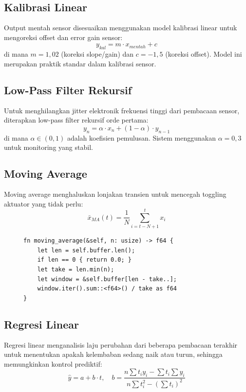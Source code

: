 \documentclass[journal]{IEEEtran}
\begin{document}
\subsection{Kalibrasi Linear}
Output mentah sensor disesuaikan menggunakan model kalibrasi linear untuk mengoreksi offset dan error gain sensor:
\begin{equation}
  y_{kal} = m \cdot x_{mentah} + c
\end{equation}
di mana $m = 1,02$ (koreksi slope/gain) dan $c = -1,5$ (koreksi offset). Model ini merupakan praktik standar dalam kalibrasi sensor.

\subsection{Low-Pass Filter Rekursif}
Untuk menghilangkan jitter elektronik frekuensi tinggi dari pembacaan sensor, diterapkan low-pass filter rekursif orde pertama:
\begin{equation}
  y_n = \alpha \cdot x_n + (1 - \alpha) \cdot y_{n-1}
\end{equation}
di mana $\alpha \in (0,1)$ adalah koefisien pemulusan. Sistem menggunakan $\alpha = 0,3$ untuk monitoring yang stabil.

\subsection{Moving Average}
Moving average menghaluskan lonjakan transien untuk mencegah toggling aktuator yang tidak perlu:
\begin{equation}
  \bar{x}_{MA}(t) = \frac{1}{N} \sum_{i=t-N+1}^{t} x_i
\end{equation}

\begin{figure}[H]
\begin{lstlisting}[caption={Implementasi Moving Average}]
fn moving_average(&self, n: usize) -> f64 {
    let len = self.buffer.len();
    if len == 0 { return 0.0; }
    let take = len.min(n);
    let window = &self.buffer[len - take..];
    window.iter().sum::<f64>() / take as f64
}
\end{lstlisting}
\end{figure}

\subsection{Regresi Linear}
Regresi linear menganalisis laju perubahan dari beberapa pembacaan terakhir untuk menentukan apakah kelembaban sedang naik atau turun, sehingga memungkinkan kontrol prediktif:
\begin{equation}
  \hat{y} = a + b \cdot t, \quad b = \frac{n\sum t_i y_i - \sum t_i \sum y_i}{n\sum t_i^2 - (\sum t_i)^2}
\end{equation}
\end{document}
